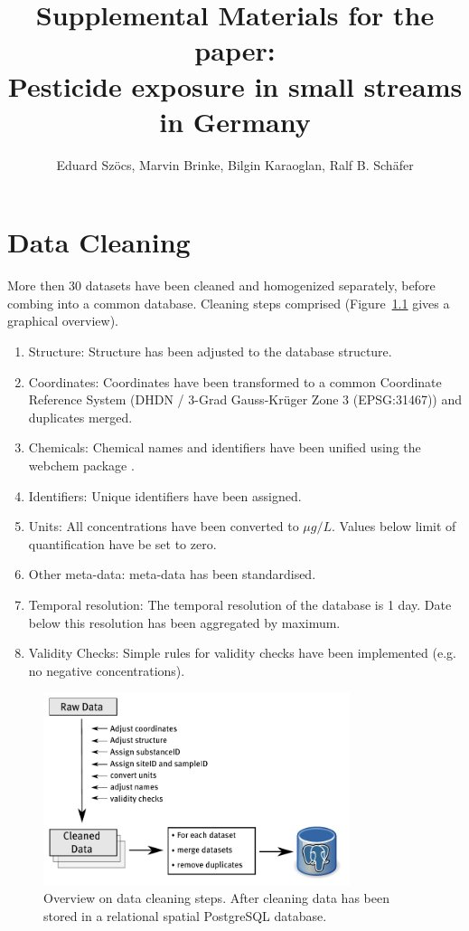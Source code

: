 \documentclass[pdftex,a4paper]{scrreprt}
\title{Supplemental Materials for the paper: \\ Pesticide exposure in small streams in Germany}
\author{Eduard Szöcs, Marvin Brinke, Bilgin Karaoglan, Ralf B. Schäfer}
\begin{document}
\maketitle

\tableofcontents
\listoffigures
\listoftables



\chapter{Data Cleaning}
More then 30 datasets have been cleaned and homogenized separately, before combing into a common database.
Cleaning steps comprised (Figure~\ref{fig:data_cleaning} gives a graphical overview).

\begin{enumerate}
	\item Structure: Structure has been adjusted to the database structure.
	\item Coordinates: Coordinates have been transformed to a common Coordinate Reference System (DHDN / 3-Grad Gauss-Krüger Zone 3 (EPSG:31467)) and duplicates merged.
	\item Chemicals: Chemical names and identifiers have been unified using the webchem package \citep{szocs_webchem:_2016}.
	\item  Identifiers: Unique identifiers have been assigned.
	\item Units: All concentrations have been converted to $\mu g/L$. Values below limit of quantification have be set to zero.
	\item Other meta-data: meta-data has been standardised.
	\item Temporal resolution: The temporal resolution of the database is 1 day. Date below this resolution has been aggregated by maximum.
	\item Validity Checks: Simple rules for validity checks have been implemented (e.g. no negative concentrations).
\end{enumerate}

\begin{figure}[h]
	\centering
	\includegraphics[width = 0.8\textwidth]{data_cleaning}
	\caption[Overview on data cleaning steps.]{Overview on data cleaning steps. After cleaning data has been stored in a relational spatial PostgreSQL database.}
	\label{fig:data_cleaning}
\end{figure}
\end{document}
